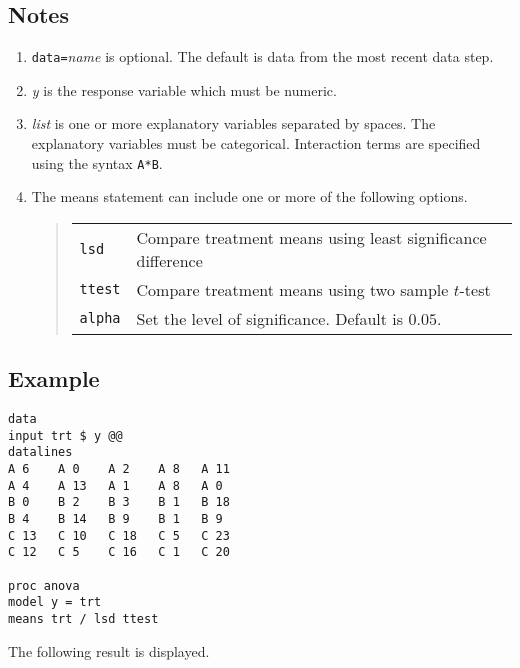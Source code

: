 \documentclass[12pt]{article}
\begin{document}
\subsection*{Notes}
\begin{enumerate}
\item
{\tt data=}{\it name} is optional.
The default is data from the most recent data step.
\item
{\it y} is the response variable which must be numeric.
\item
{\it list} is one or more explanatory variables separated by spaces.
The explanatory variables must be categorical.
Interaction terms are specified using the syntax {\tt A*B}.
\item
The means statement can include one or more of the following options.
\begin{quote}
\begin{tabular}{ll}
{\tt lsd} & Compare treatment means using least significance difference \\
{\tt ttest} & Compare treatment means using two sample $t$-test \\
{\tt alpha} & Set the level of significance. Default is $0.05$.
\end{tabular}
\end{quote}
\end{enumerate}

\subsection*{Example}
\begin{Verbatim}
data
input trt $ y @@
datalines
A 6    A 0    A 2    A 8   A 11
A 4    A 13   A 1    A 8   A 0
B 0    B 2    B 3    B 1   B 18
B 4    B 14   B 9    B 1   B 9
C 13   C 10   C 18   C 5   C 23
C 12   C 5    C 16   C 1   C 20

proc anova
model y = trt
means trt / lsd ttest
\end{Verbatim}

The following result is displayed.
\end{document}
